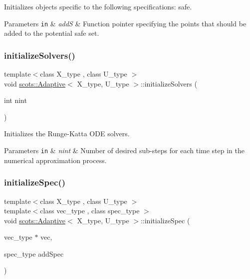 Initializes objects specific to the following specifications\+: safe. 
\begin{DoxyParams}[1]{Parameters}
\mbox{\tt in}  & {\em addS} & Function pointer specifying the points that should be added to the potential safe set. \\
\hline
\end{DoxyParams}
\mbox{\label{classscots_1_1Adaptive_a25cc058f39f38402ff914ae6b927393e}} 
\subsubsection{\texorpdfstring{initialize\+Solvers()}{initializeSolvers()}}
{\footnotesize\ttfamily template$<$class X\+\_\+type , class U\+\_\+type $>$ \\
void \hyperlink{classscots_1_1Adaptive}{scots\+::\+Adaptive}$<$ X\+\_\+type, U\+\_\+type $>$\+::initialize\+Solvers (\begin{DoxyParamCaption}\item[{int}]{nint }\end{DoxyParamCaption})\hspace{0.3cm}{\ttfamily [inline]}}

Initializes the Runge-\/\+Katta O\+DE solvers. 
\begin{DoxyParams}[1]{Parameters}
\mbox{\tt in}  & {\em nint} & Number of desired sub-\/steps for each time step in the numerical approximation process. \\
\hline
\end{DoxyParams}
\mbox{\label{classscots_1_1Adaptive_aac25a2399ed09b07ef546579c94b0726}} 
\subsubsection{\texorpdfstring{initialize\+Spec()}{initializeSpec()}}
{\footnotesize\ttfamily template$<$class X\+\_\+type , class U\+\_\+type $>$ \\
template$<$class vec\+\_\+type , class spec\+\_\+type $>$ \\
void \hyperlink{classscots_1_1Adaptive}{scots\+::\+Adaptive}$<$ X\+\_\+type, U\+\_\+type $>$\+::initialize\+Spec (\begin{DoxyParamCaption}\item[{vec\+\_\+type $\ast$}]{vec,  }\item[{spec\+\_\+type}]{add\+Spec }\end{DoxyParamCaption})\hspace{0.3cm}{\ttfamily [inline]}}

